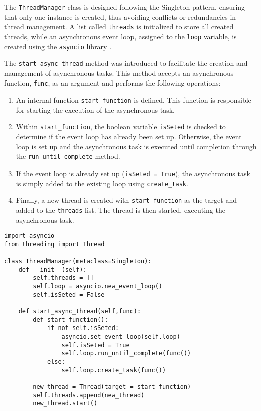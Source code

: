 The \texttt{ThreadManager} class is designed following the Singleton pattern, ensuring that only one instance is created, thus avoiding conflicts or redundancies in thread management. A list called \texttt{threads} is initialized to store all created threads, while an asynchronous event loop, assigned to the \texttt{loop} variable, is created using the \texttt{asyncio} library \cite{pythonAsyncio}.

The \texttt{start\_async\_thread} method was introduced to facilitate the creation and management of asynchronous tasks. This method accepts an asynchronous function, \texttt{func}, as an argument and performs the following operations:

\begin{enumerate}
    \item An internal function \texttt{start\_function} is defined. This function is responsible for starting the execution of the asynchronous task.
    \item Within \texttt{start\_function}, the boolean variable \texttt{isSeted} is checked to determine if the event loop has already been set up. Otherwise, the event loop is set up and the asynchronous task is executed until completion through the \texttt{run\_until\_complete} method.
    \item If the event loop is already set up (\texttt{isSeted = True}), the asynchronous task is simply added to the existing loop using \texttt{create\_task}.
    \item Finally, a new thread is created with \texttt{start\_function} as the target and added to the \texttt{threads} list. The thread is then started, executing the asynchronous task.
\end{enumerate}

\begin{verbatim}
import asyncio
from threading import Thread

class ThreadManager(metaclass=Singleton):
    def __init__(self):
        self.threads = []
        self.loop = asyncio.new_event_loop()
        self.isSeted = False

    def start_async_thread(self,func):
        def start_function():
            if not self.isSeted:
                asyncio.set_event_loop(self.loop)
                self.isSeted = True
                self.loop.run_until_complete(func())
            else:
                self.loop.create_task(func())

        new_thread = Thread(target = start_function)
        self.threads.append(new_thread)
        new_thread.start()
\end{verbatim}

